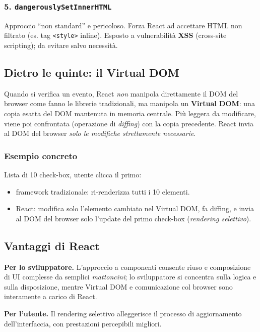 \documentclass[11pt,a4paper]{article}
\begin{document}
\subsubsection{5. \texttt{dangerouslySetInnerHTML}}
Approccio ``non standard'' e pericoloso. Forza React ad accettare HTML non filtrato (es. tag \texttt{<style>} inline). Esposto a vulnerabilit\`a \textbf{XSS} (cross-site scripting); da evitare salvo necessit\`a.

\subsection{Dietro le quinte: il Virtual DOM}

Quando si verifica un evento, React \emph{non} manipola direttamente il DOM del browser come fanno le librerie tradizionali, ma manipola un \textbf{Virtual DOM}: una copia esatta del DOM mantenuta in memoria centrale. Pi\`u leggera da modificare, viene poi confrontata (operazione di \emph{diffing}) con la copia precedente. React invia al DOM del browser \emph{solo le modifiche strettamente necessarie}.

\subsubsection{Esempio concreto}
Lista di 10 check-box, utente clicca il primo:
\begin{itemize}[leftmargin=*]
    \item framework tradizionale: ri-renderizza tutti i 10 elementi.
    \item React: modifica solo l'elemento cambiato nel Virtual DOM, fa diffing, e invia al DOM del browser solo l'update del primo check-box (\emph{rendering selettivo}).
\end{itemize}

\subsection{Vantaggi di React}

\textbf{Per lo sviluppatore.} L'approccio a componenti consente riuso e composizione di UI complesse da semplici \emph{mattoncini}; lo sviluppatore si concentra sulla logica e sulla disposizione, mentre Virtual DOM e comunicazione col browser sono interamente a carico di React.

\textbf{Per l'utente.} Il rendering selettivo alleggerisce il processo di aggiornamento dell'interfaccia, con prestazioni percepibili migliori.
\end{document}
